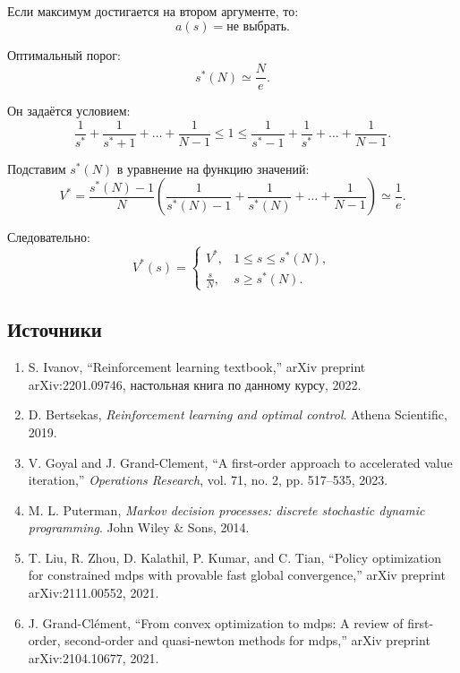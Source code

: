 \documentclass[12pt,a4paper]{article}
\begin{document}
Если максимум достигается на втором аргументе, то:
\[
a(s)=\text{не выбрать}.
\]

Оптимальный порог:
\[
s^\ast(N) \simeq \frac{N}{e}.
\]

Он задаётся условием:
\[
\frac{1}{s^\ast}
+
\frac{1}{s^\ast+1}
+
\ldots
+
\frac{1}{N-1}
\le
1
\le
\frac{1}{s^\ast-1}
+
\frac{1}{s^\ast}
+
\ldots
+
\frac{1}{N-1}.
\]

Подставим $s^\ast(N)$ в уравнение на функцию значений:
\[
V^\ast
=
\frac{s^\ast(N)-1}{N}
\left(
\frac{1}{s^\ast(N)-1}
+
\frac{1}{s^\ast(N)}
+
\ldots
+
\frac{1}{N-1}
\right)
\simeq
\frac{1}{e}.
\]

Следовательно:
\[
V^\ast(s)
=
\begin{cases}
V^\ast, & 1 \le s \le s^\ast(N),\\
\frac{s}{N}, & s \ge s^\ast(N).
\end{cases}
\]

\subsection{Источники}

\begin{enumerate}
    \item S. Ivanov, ``Reinforcement learning textbook,'' arXiv preprint arXiv:2201.09746, настольная книга по данному курсу, 2022.

    \item D. Bertsekas, \textit{Reinforcement learning and optimal control}. Athena Scientific, 2019.

    \item V. Goyal and J. Grand-Clement, ``A first-order approach to accelerated value iteration,'' \textit{Operations Research}, vol. 71, no. 2, pp. 517--535, 2023.

    \item M. L. Puterman, \textit{Markov decision processes: discrete stochastic dynamic programming}. John Wiley \& Sons, 2014.

    \item T. Liu, R. Zhou, D. Kalathil, P. Kumar, and C. Tian, ``Policy optimization for constrained mdps with provable fast global convergence,'' arXiv preprint arXiv:2111.00552, 2021.

    \item J. Grand-Clément, ``From convex optimization to mdps: A review of first-order, second-order and quasi-newton methods for mdps,'' arXiv preprint arXiv:2104.10677, 2021.
\end{enumerate}
\end{document}
